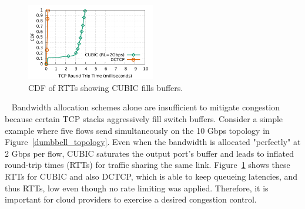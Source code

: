 

\begin{figure}[!t]
        \centering
  \includegraphics[width=0.5\textwidth]{acdctcp/figures/motivation/motivation_2Gbps_cubic_rl_dctcp_sockperf.pdf}
        \caption{CDF of RTTs showing CUBIC fills buffers.}
        \label{cubic-fill}
\end{figure}
~
Bandwidth allocation schemes alone are insufficient to mitigate congestion because certain TCP stacks aggressively
fill switch buffers. Consider a simple example where five flows send simultaneously
on the 10 Gbps topology in Figure~\ref{dumbbell_topology}. Even when the bandwidth is allocated "perfectly"
at 2 Gbps per flow, CUBIC saturates the output port's buffer and leads to inflated round-trip times (RTTs) for traffic
sharing the same link.
Figure~\ref{cubic-fill} shows these RTTs for CUBIC and also DCTCP, 
which is able to keep queueing latencies, and thus RTTs, low even though no rate limiting was applied.
Therefore, it is important for cloud providers to exercise a desired congestion
control.

